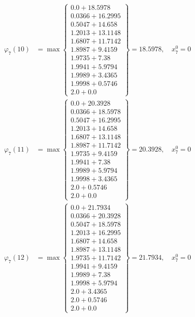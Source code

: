 \documentclass{article}
\begin{document}
\begin{align*}
  
  
  
\varphi_{7}(10) &= \max \left\{ \begin{array}{c}
0.0 + 18.5978 \\
 0.0366 + 16.2995 \\
 0.5047 + 14.658 \\
 1.2013 + 13.1148 \\
 1.6807 + 11.7142 \\
 1.8987 + 9.4159 \\
 1.9735 + 7.38 \\
 1.9941 + 5.9794 \\
 1.9989 + 3.4365 \\
 1.9998 + 0.5746 \\
 2.0 + 0.0
\end{array} \right\}=18.5978,\quad x_{7}^0=0\\
  
  
  
  
\varphi_{7}(11) &= \max \left\{ \begin{array}{c}
0.0 + 20.3928 \\
 0.0366 + 18.5978 \\
 0.5047 + 16.2995 \\
 1.2013 + 14.658 \\
 1.6807 + 13.1148 \\
 1.8987 + 11.7142 \\
 1.9735 + 9.4159 \\
 1.9941 + 7.38 \\
 1.9989 + 5.9794 \\
 1.9998 + 3.4365 \\
 2.0 + 0.5746 \\
 2.0 + 0.0
\end{array} \right\}=20.3928,\quad x_{7}^0=0\\
  
  
  
  
\varphi_{7}(12) &= \max \left\{ \begin{array}{c}
0.0 + 21.7934 \\
 0.0366 + 20.3928 \\
 0.5047 + 18.5978 \\
 1.2013 + 16.2995 \\
 1.6807 + 14.658 \\
 1.8987 + 13.1148 \\
 1.9735 + 11.7142 \\
 1.9941 + 9.4159 \\
 1.9989 + 7.38 \\
 1.9998 + 5.9794 \\
 2.0 + 3.4365 \\
 2.0 + 0.5746 \\
 2.0 + 0.0
\end{array} \right\}=21.7934,\quad x_{7}^0=0\\
  

\end{align*}
\end{document}
